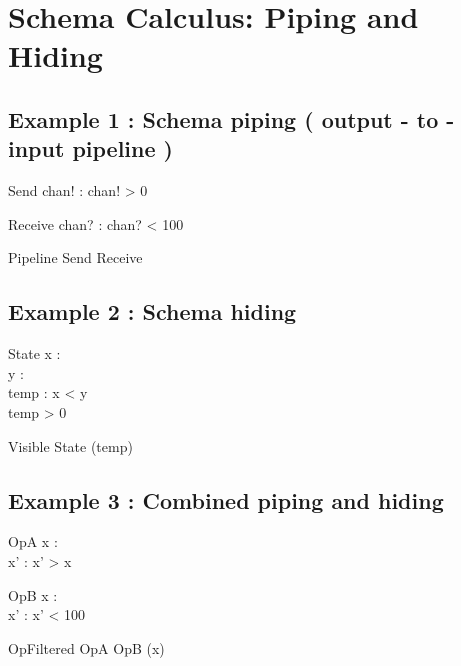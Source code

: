 \documentclass[a4paper,10pt,fleqn]{article}
\begin{document}
\section*{Schema Calculus: Piping and Hiding}

\subsection*{Example 1 : Schema piping ( output - to - input pipeline )}

\begin{schema}{Send}
chan! : \nat
\where
chan! > 0
\end{schema}

\begin{schema}{Receive}
chan? : \nat
\where
chan? < 100
\end{schema}

\begin{zed}
Pipeline  Send \pipe Receive
\end{zed}

\subsection*{Example 2 : Schema hiding}

\begin{schema}{State}
x : \nat \\
y : \nat \\
temp : \nat
\where
x < y \\
temp > 0
\end{schema}

\begin{zed}
Visible  State \hide (temp)
\end{zed}

\subsection*{Example 3 : Combined piping and hiding}

\begin{schema}{OpA}
x : \nat \\
x' : \nat
\where
x' > x
\end{schema}

\begin{schema}{OpB}
x : \nat \\
x' : \nat
\where
x' < 100
\end{schema}

\begin{zed}
OpFiltered  OpA \semi OpB \hide (x)
\end{zed}
\end{document}
